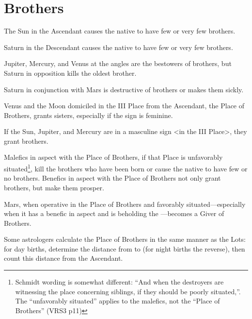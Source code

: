 \section{Brothers}

The Sun in the Ascendant causes the native to have few or very few brothers. 

Saturn in the Descendant causes the native to have few or very few brothers. 

Jupiter, Mercury, and Venus at the angles are the bestowers of brothers, but Saturn in opposition kills the oldest brother. 

Saturn in conjunction with Mars is destructive of brothers or makes them sickly. 

Venus and the Moon domiciled in the III Place from the Ascendant, the Place of Brothers, grants sisters, especially if the sign is feminine. 

If the Sun, Jupiter, and Mercury are in a masculine sign <in the III Place>, they grant brothers. 

Malefics in aspect with the Place of Brothers, if that Place is unfavorably situated\footnote{Schmidt wording is somewhat different: ``And when the destroyers are witnessing the place concerning siblings, if they should be poorly situated,''. The ``unfavorably situated'' applies to the malefics, not the ``Place of Brothers'' (VRS3 p11)}, kill the brothers who have been born or cause the native to have few or no brothers. Benefics in aspect with the Place of Brothers not only grant brothers, but make them prosper. 

Mars, when operative in the Place of Brothers and favorably situated—especially when it has a benefic in aspect and is beholding the \Moon—becomes a Giver of Brothers.

Some astrologers calculate the Place of Brothers in the same manner as the Lots: for day births, determine the distance from \Saturn\xspace to \Jupiter\xspace (for night births the reverse), then count this distance from the Ascendant.

\newpage